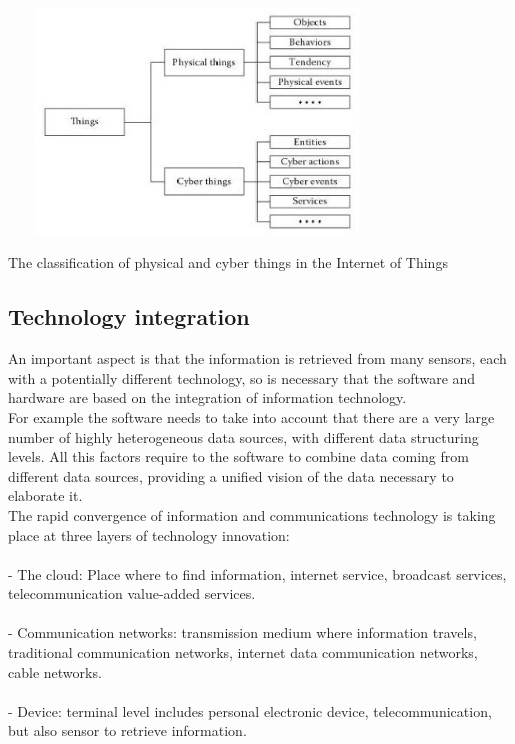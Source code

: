 \documentclass[a4paper,10pt]{article}
\makeatletter
\newenvironment{figurehere}{\def\@captype{figure}\vspace{2ex}}{\vspace{2ex}}
\makeatother
\begin{document}
\begin{multicols}{2}
\begin{figurehere}
 \centering
 \includegraphics[width=10cm, height=6cm]{./eps/Things.eps}
 \caption{The classification of physical and cyber things in the Internet of Things}
 \label{fig:myfigure1}
\end{figurehere}



\subsection{Technology integration}

An important aspect is that the information is retrieved from many sensors, each with a potentially different technology, so is necessary that the software and hardware are based on the integration of information technology.\\ For example the software needs to take into account that there are a very large number of highly heterogeneous data sources, with different data structuring levels. All this factors require to the software to combine data coming from diﬀerent data sources, providing a uniﬁed vision of the data necessary to elaborate it.\\The rapid convergence of information and communications technology is taking place at three layers of technology innovation:\\\\
- The cloud: Place where to find information, internet service, broadcast services, telecommunication value-added services.\\\\
- Communication networks: transmission medium where information travels, traditional communication networks, internet data communication networks, cable networks.\\\\
- Device: terminal level includes personal electronic device, telecommunication, but also sensor to retrieve information.



\end{multicols}
\end{document}
